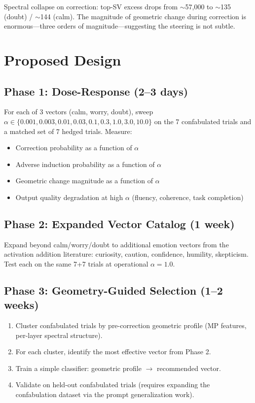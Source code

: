 \documentclass[11pt,letterpaper]{article}
\begin{document}
\noindent Spectral collapse on correction: top-SV excess drops from
$\sim$57,000 to $\sim$135 (doubt) / $\sim$144 (calm). The magnitude
of geometric change during correction is enormous---three orders of
magnitude---suggesting the steering is not subtle.

\section{Proposed Design}

\subsection{Phase 1: Dose-Response (2--3 days)}

For each of 3 vectors (calm, worry, doubt), sweep $\alpha \in
\{0.001, 0.003, 0.01, 0.03, 0.1, 0.3, 1.0, 3.0, 10.0\}$ on the 7
confabulated trials and a matched set of 7 hedged trials. Measure:
\begin{itemize}
  \item Correction probability as a function of $\alpha$
  \item Adverse induction probability as a function of $\alpha$
  \item Geometric change magnitude as a function of $\alpha$
  \item Output quality degradation at high $\alpha$ (fluency,
    coherence, task completion)
\end{itemize}

\subsection{Phase 2: Expanded Vector Catalog (1 week)}

Expand beyond calm/worry/doubt to additional emotion vectors from
the activation addition literature: curiosity, caution, confidence,
humility, skepticism. Test each on the same 7+7 trials at operational
$\alpha = 1.0$.

\subsection{Phase 3: Geometry-Guided Selection (1--2 weeks)}

\begin{enumerate}
  \item Cluster confabulated trials by pre-correction geometric
    profile (MP features, per-layer spectral structure).
  \item For each cluster, identify the most effective vector from
    Phase 2.
  \item Train a simple classifier: geometric profile $\to$
    recommended vector.
  \item Validate on held-out confabulated trials (requires expanding
    the confabulation dataset via the prompt generalization work).
\end{enumerate}
\end{document}

